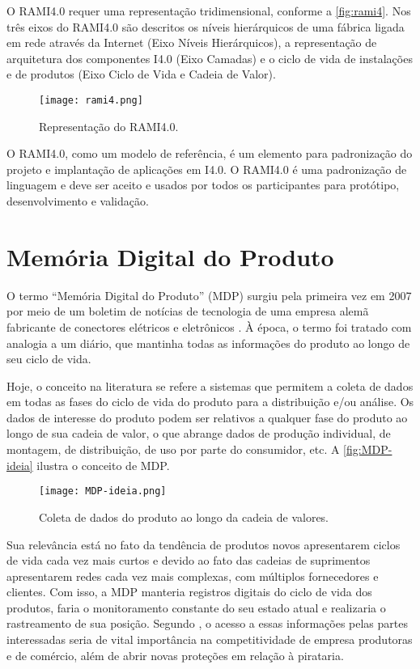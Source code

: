 	O RAMI4.0 requer uma representação tridimensional, conforme a \autoref{fig:rami4}. Nos três eixos do RAMI4.0 são descritos os níveis hierárquicos de uma fábrica ligada em rede através da Internet (Eixo Níveis Hierárquicos), a representação de arquitetura dos componentes I4.0 (Eixo Camadas) e o ciclo de vida de instalações e de produtos (Eixo Ciclo de Vida e Cadeia de Valor).
	
	\begin{figure}[htb]
		\centering
		\caption{Representação do RAMI4.0.}
		\label{fig:rami4}
		\texttt{[image: rami4.png]}
	\end{figure}

	O RAMI4.0, como um modelo de referência, é um elemento para padronização do projeto e implantação de aplicações em I4.0. O RAMI4.0 é uma padronização de linguagem e deve ser aceito e usados por todos os participantes para protótipo, desenvolvimento e validação.

\section{Memória Digital do Produto}

	O termo ``Memória Digital do Produto'' (MDP) surgiu pela primeira vez em 2007 por meio de um boletim de notícias de tecnologia de uma empresa alemã fabricante de conectores elétricos e eletrônicos \cite{wahlster2007digitalmemory}. À época, o termo foi tratado com analogia a um diário, que mantinha todas as informações do produto ao longo de seu ciclo de vida.

	Hoje, o conceito na literatura se refere a sistemas que permitem a coleta de dados em todas as fases do ciclo de vida do produto para a distribuição e/ou análise. Os dados de interesse do produto podem ser relativos a qualquer fase do produto ao longo de sua cadeia de valor, o que abrange dados de produção individual, de montagem, de distribuição, de uso por parte do consumidor, etc. A \autoref{fig:MDP-ideia} ilustra o conceito de MDP.
	 
	\begin{figure}[htb]
		\centering
		\caption{Coleta de dados do produto ao longo da cadeia de valores.}
		\label{fig:MDP-ideia}
		\texttt{[image: MDP-ideia.png]}
	\end{figure}

	Sua relevância está no fato da tendência de produtos novos apresentarem ciclos de vida cada vez mais curtos e devido ao fato das cadeias de suprimentos apresentarem redes cada vez mais complexas, com múltiplos fornecedores e clientes. Com isso, a MDP manteria registros digitais do ciclo de vida dos produtos, faria o monitoramento constante do seu estado atual e realizaria o rastreamento de sua posição. Segundo , o acesso a essas informações pelas partes interessadas seria de vital importância na competitividade de empresa produtoras e de comércio, além de abrir novas proteções em relação à pirataria.
	
